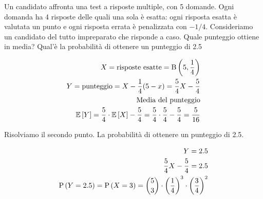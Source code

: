 \begin{exrc}
    Un candidato affronta una test a risposte multiple, con 5 domande. Ogni domanda ha 4 risposte delle quali una sola è esatta: ogni risposta esatta è valutata un punto e ogni risposta errata è penalizzata con \(-1/4\). Consideriamo un candidato del tutto impreparato che risponde a caso. Quale punteggio ottiene in media? Qual'è la probabilità di ottenere un punteggio di 2.5

    \begin{equation*}
        \begin{aligned}
            X = \text{risposte esatte} = \text{B}\left(5,\frac{1}{4}\right) \\
            Y = \text{punteggio} = X - \frac{1}{4} (5-x) = \frac{5}{4}X - \frac{5}{4} \\
            \text{Media del punteggio} \\
            \mathbb{E}\left[Y\right] = \frac{5}{4} \cdot \mathbb{E}\left[X\right] - \frac{5}{4} = \frac{5}{4} \cdot \frac{5}{4} - \frac{5}{4} = \frac{5}{16} \\
        \end{aligned}
    \end{equation*}

    Risolviamo il secondo punto. La probabilità di ottenere un punteggio di 2.5.

    \begin{equation*}
        \begin{aligned}
            Y = 2.5 \\
            \frac{5}{4}X - \frac{5}{4} = 2.5 \\
            \text{P}\left(Y = 2.5\right) = \text{P}\left(X = 3\right) = \binom{5}{3} \cdot \left( \frac{1}{4} \right)^3 \cdot \left( \frac{3}{4} \right)^2
        \end{aligned}
    \end{equation*}

\end{exrc}